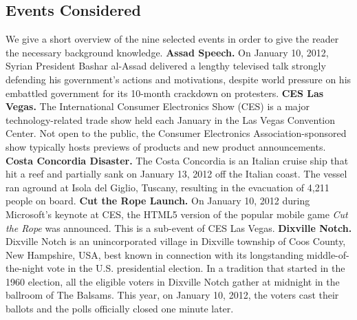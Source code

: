 \documentclass{acm_proc_article-sp}
\newcommand{\inlinelistingsize}{\fontsize{8pt}{11pt}}
\let\oldurl\url
\renewcommand{\url}[1]{\inlinelistingsize\oldurl{#1}}
\begin{document}
\subsection{Events Considered}
We give a short overview of the nine selected events in order to give the reader the necessary background knowledge.
\newline
\textbf{Assad Speech.} On January 10, 2012, Syrian President Bashar al-Assad delivered a lengthy televised talk strongly defending his government's actions and motivations, despite world pressure on his embattled government for its 10-month crackdown on protesters.
\newline
\textbf{CES Las Vegas.} The International Consumer Electronics Show (CES) is a major technology-related trade show held each January in the Las Vegas Convention Center. Not open to the public, the Consumer Electronics Association-sponsored show typically hosts previews of products and new product announcements.
\newline
\textbf{Costa Concordia Disaster.} The Costa Concordia is an Italian cruise ship that hit a reef and partially sank on January 13, 2012 off the Italian coast.
The vessel ran aground at Isola del Giglio, Tuscany, resulting in the evacuation of 4,211 people on board.
\newline
\textbf{Cut the Rope Launch.} On January 10, 2012 during Microsoft's keynote at CES, the HTML5 version of the popular mobile game \textit{Cut the Rope} was announced. This is a sub-event of CES Las Vegas.
\newline
\textbf{Dixville Notch.} Dixville Notch is an unincorporated village in Dixville township of Coos County, New Hampshire, USA, best known in connection with its longstanding middle-of-the-night vote in the U.S. presidential election. In a tradition that started in the 1960 election, all the eligible voters in Dixville Notch gather at midnight in the ballroom of The Balsams. This year, on January 10, 2012, the voters cast their ballots and the polls officially closed one minute later.
\newline
\end{document}
